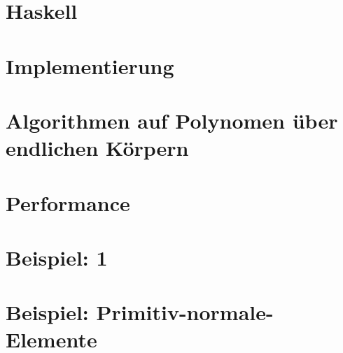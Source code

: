 \documentclass[ngerman
  ,fontsize=11pt %
  ,numbers=noenddot %
  ,parskip=half*
  ,openany
  ,DIV=10
  ,fleqn %
  ,oneside
]{./myClass}
\begin{document}
\ifnum{}
  \frontmatter
  
  \newpage \thispagestyle{empty} \mbox{}
\else
  \mainmatter
\fi

\tableofcontents{}


\ifnum{}
  \mainmatter
\fi

%

\chapter{Haskell}


\chapter{Implementierung}


%
%
%
%


\chapter{Algorithmen auf Polynomen über endlichen Körpern}
%
%
%

\chapter{Performance}

\chapter{Beispiel: 1}

\chapter{Beispiel: Primitiv-normale-Elemente}



%

\pagebreak
\printbibliography

\appendix
{}



\end{document}
